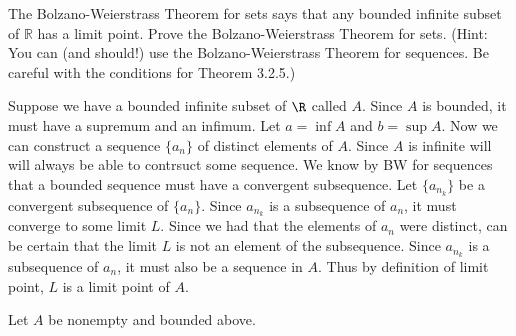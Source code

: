 \documentclass[answers,12pt,addpoints]{exam}
\begin{document}
\begin{questions}
    \question The Bolzano-Weierstrass Theorem for sets says that any bounded infinite subset of $\mathbb{R}$ has a limit point. Prove the Bolzano-Weierstrass Theorem for sets. (Hint: You can (and should!) use the Bolzano-Weierstrass Theorem for sequences. Be careful with the conditions for Theorem 3.2.5.)
    \begin{solution}
        Suppose we have a bounded infinite subset of $\R$ called $A$. Since $A$ is bounded, it must have a supremum and an infimum. Let $a = \inf A$ and $b = \sup A$. Now we can construct a sequence $\{a_n\}$ of distinct elements of $A$. Since $A$ is infinite will will always be able to contrsuct some sequence. We know by BW for sequences that a bounded sequence must have a convergent subsequence. Let $\{a_{n_k}\}$ be a convergent subsequence of $\{a_n\}$. Since $a_{n_k}$ is a subsequence of $a_n$, it must converge to some limit $L$. Since we had that the elements of $a_n$ were distinct, can be certain that the limit $L$ is not an element of the subsequence. Since $a_{n_k}$ is a subsequence of $a_n$, it must also be a sequence in $A$. Thus by definition of limit point, $L$ is a limit point of $A$.
    \end{solution}
    \question Let $A$ be nonempty and bounded above.


\end{questions}
\end{document}
